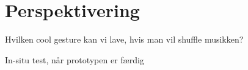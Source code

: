 \chapter{Perspektivering}
\label{Perspektivering}
Hvilken cool gesture kan vi lave, hvis man vil shuffle musikken?

In-situ test, når prototypen er færdig